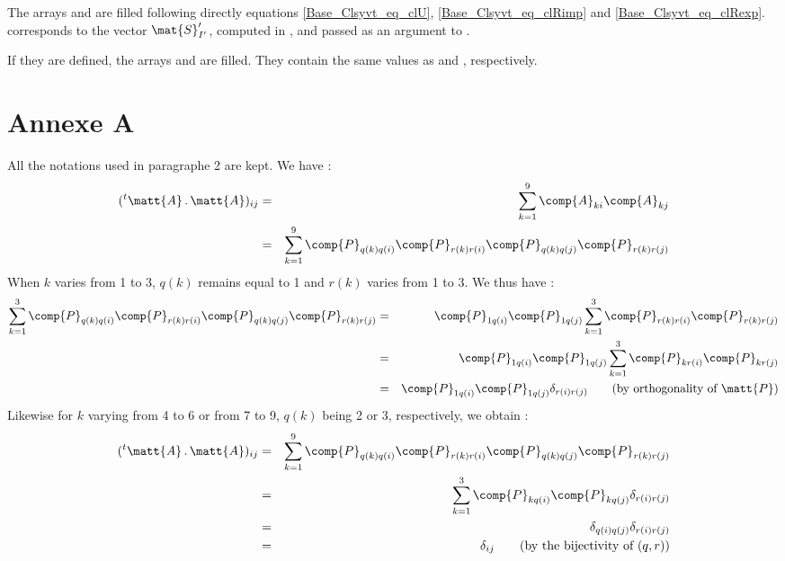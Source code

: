 The arrays  and  are filled following directly
equations \ref{Base_Clsyvt_eq_clU}, \ref{Base_Clsyvt_eq_clRimp} and \ref{Base_Clsyvt_eq_clRexp}.\\
 corresponds to the vector $\mat{S}_{I'}^\prime$, computed in
, and passed as an argument to .

If they are defined, the arrays  and 
are filled. They contain the same values as  and
, respectively.


\section*{Annexe A}

All the notations used in paragraphe 2 are kept. We have :
\begin{eqnarray}
(^t\matt{A}\,.\,\matt{A})_{ij}
& = & \sum_{k=1}^9\comp{A}_{ki}\comp{A}_{kj}\nonumber\\
& = & \sum_{k=1}^9
\comp{P}_{q(k)q(i)}\comp{P}_{r(k)r(i)}\comp{P}_{q(k)q(j)}\comp{P}_{r(k)r(j)}
\end{eqnarray}
When $k$ varies from 1 to 3, $q(k)$ remains equal to 1 and $r(k)$ varies from 1
to 3. We thus have :
\begin{eqnarray}
\sum_{k=1}^3
\comp{P}_{q(k)q(i)}\comp{P}_{r(k)r(i)}\comp{P}_{q(k)q(j)}\comp{P}_{r(k)r(j)}
&=&\comp{P}_{1q(i)}\comp{P}_{1q(j)}\sum_{k=1}^3
\comp{P}_{r(k)r(i)}\comp{P}_{r(k)r(j)}\nonumber\\
&=&\comp{P}_{1q(i)}\comp{P}_{1q(j)}\sum_{k=1}^3
\comp{P}_{kr(i)}\comp{P}_{kr(j)}\\
&=&\comp{P}_{1q(i)}\comp{P}_{1q(j)}\delta_{r(i)r(j)}\qquad\text{(by
orthogonality of $\matt{P}$)}\nonumber
\end{eqnarray}
Likewise for $k$ varying from 4 to 6 or from 7 to 9, $q(k)$ being 2 or 3, respectively,
 we obtain :
\begin{eqnarray}
(^t\matt{A}\,.\,\matt{A})_{ij}
&=&
\sum_{k=1}^9
\comp{P}_{q(k)q(i)}\comp{P}_{r(k)r(i)}\comp{P}_{q(k)q(j)}\comp{P}_{r(k)r(j)}
\nonumber\\
&=&
\sum_{k=1}^3\comp{P}_{kq(i)}\comp{P}_{kq(j)}\delta_{r(i)r(j)}\\
&=&\delta_{q(i)q(j)}\delta_{r(i)r(j)}\nonumber\\
&=&\delta_{ij}\qquad
\text{(by the bijectivity of $(q,r)$)}\nonumber
\end{eqnarray}

